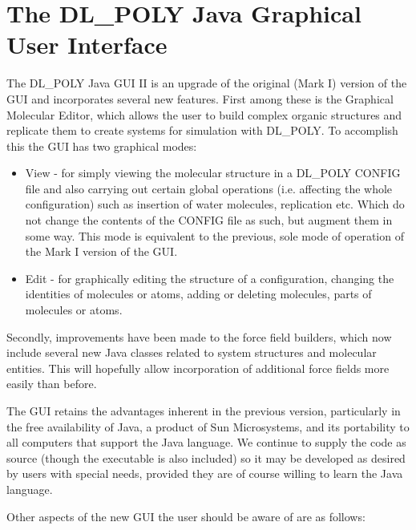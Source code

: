 \section{The DL\_POLY Java Graphical User Interface}
  The DL\_POLY Java GUI II is an upgrade of the
original (Mark I) version of the GUI and incorporates several new features.
First among these is the Graphical Molecular Editor, which allows the user to
build complex organic structures and replicate them to create systems for
simulation with DL\_POLY. To accomplish this the GUI has two graphical modes:

\begin{itemize}
\item View - for simply viewing the molecular structure in a DL\_POLY CONFIG
  file and also carrying out certain global operations (i.e. affecting the
  whole configuration) such as insertion of water molecules, replication etc.
  Which do not change the contents of the CONFIG file as such, but augment
  them in some way. This mode is equivalent to the previous, sole mode of
  operation of the Mark I version of the GUI.  
\item Edit - for graphically editing the structure of a configuration,
  changing the identities of molecules or atoms, adding or deleting molecules,
  parts of molecules or atoms.
\end{itemize}
Secondly, improvements have been made to the force field builders, which now
include several new Java classes related to system structures and molecular
entities. This will hopefully allow incorporation of additional force fields
more easily than before.

The GUI retains the advantages inherent in the previous version, particularly
in the free availability of Java, a product of Sun Microsystems, and its
portability to all computers that support the Java language. We continue to
supply the code as source (though the executable is also included) so it may
be developed as desired by users with special needs, provided they are of
course willing to learn the Java language.

Other aspects of the new GUI the user should be aware of are as follows:

